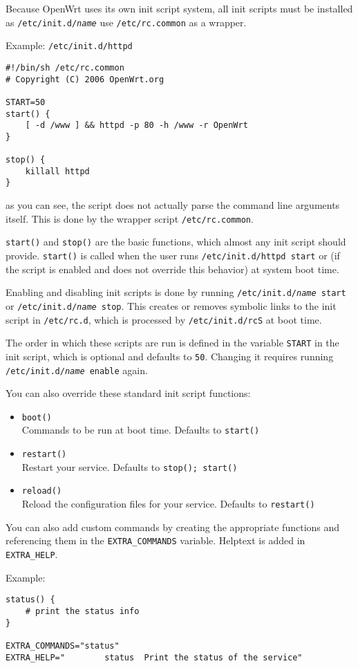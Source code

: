 Because OpenWrt uses its own init script system, all init scripts must be installed
as \texttt{/etc/init.d/\textit{name}} use \texttt{/etc/rc.common} as a wrapper.

Example: \texttt{/etc/init.d/httpd}

\begin{Verbatim}
#!/bin/sh /etc/rc.common
# Copyright (C) 2006 OpenWrt.org

START=50
start() {
    [ -d /www ] && httpd -p 80 -h /www -r OpenWrt
}

stop() {
    killall httpd
}
\end{Verbatim}

as you can see, the script does not actually parse the command line arguments itself.
This is done by the wrapper script \texttt{/etc/rc.common}.

\texttt{start()} and \texttt{stop()} are the basic functions, which almost any init
script should provide. \texttt{start()} is called when the user runs \texttt{/etc/init.d/httpd start}
or (if the script is enabled and does not override this behavior) at system boot time.

Enabling and disabling init scripts is done by running \texttt{/etc/init.d/\textit{name} start}
or \texttt{/etc/init.d/\textit{name} stop}. This creates or removes symbolic links to the
init script in \texttt{/etc/rc.d}, which is processed by \texttt{/etc/init.d/rcS} at boot time.

The order in which these scripts are run is defined in the variable \texttt{START} in the init
script, which is optional and defaults to \texttt{50}. Changing it requires running
\texttt{/etc/init.d/\textit{name} enable} again.

You can also override these standard init script functions:
\begin{itemize}
    \item \texttt{boot()} \\
        Commands to be run at boot time. Defaults to \texttt{start()}

    \item \texttt{restart()} \\
        Restart your service. Defaults to \texttt{stop(); start()}

    \item \texttt{reload()} \\
        Reload the configuration files for your service. Defaults to \texttt{restart()}

\end{itemize}

You can also add custom commands by creating the appropriate functions and referencing them
in the \texttt{EXTRA\_COMMANDS} variable. Helptext is added in \texttt{EXTRA\_HELP}.

Example:

\begin{Verbatim}
status() {
    # print the status info
}

EXTRA_COMMANDS="status"
EXTRA_HELP="        status  Print the status of the service"
\end{Verbatim}

